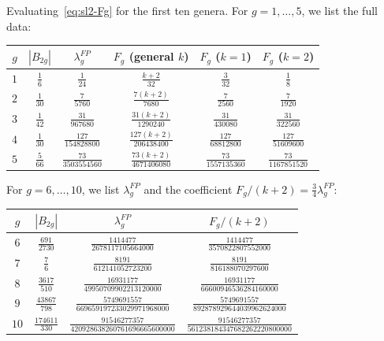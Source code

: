 \begin{computation}[Explicit values through \texorpdfstring{$g = 10$}{g = 10}]\label{comp:sl2-genus-table}
Evaluating~\eqref{eq:sl2-Fg} for the first ten genera.
For $g = 1, \ldots, 5$, we list the full data:

\medskip
\begin{center}
\renewcommand{\arraystretch}{1.3}
\begin{tabular}{cccccc}
\toprule
$g$ & $|B_{2g}|$ & $\lambda_g^{FP}$ & $F_g$ (general $k$) & $F_g$ ($k=1$) & $F_g$ ($k=2$)  \\
\midrule
$1$ & $\frac{1}{6}$ & $\frac{1}{24}$ & $\frac{k+2}{32}$ & $\frac{3}{32}$ & $\frac{1}{8}$  \\[6pt]
$2$ & $\frac{1}{30}$ & $\frac{7}{5760}$ & $\frac{7(k+2)}{7680}$ & $\frac{7}{2560}$ & $\frac{7}{1920}$  \\[6pt]
$3$ & $\frac{1}{42}$ & $\frac{31}{967680}$ & $\frac{31(k+2)}{1290240}$ & $\frac{31}{430080}$ & $\frac{31}{322560}$  \\[6pt]
$4$ & $\frac{1}{30}$ & $\frac{127}{154828800}$ & $\frac{127(k+2)}{206438400}$ & $\frac{127}{68812800}$ & $\frac{127}{51609600}$  \\[6pt]
$5$ & $\frac{5}{66}$ & $\frac{73}{3503554560}$ & $\frac{73(k+2)}{4671406080}$ & $\frac{73}{1557135360}$ & $\frac{73}{1167851520}$  \\[4pt]
\bottomrule
\end{tabular}
\end{center}

\medskip
\noindent
For $g = 6, \ldots, 10$, we list $\lambda_g^{FP}$ and the coefficient
$F_g/(k{+}2) = \frac{3}{4}\lambda_g^{FP}$:

\medskip
\begin{center}
\renewcommand{\arraystretch}{1.3}
\begin{tabular}{cccc}
\toprule
$g$ & $|B_{2g}|$ & $\lambda_g^{FP}$ & $F_g/(k{+}2)$ \\
\midrule
$6$ & $\frac{691}{2730}$ & $\frac{1414477}{2678117105664000}$ & $\frac{1414477}{3570822807552000}$ \\[6pt]
$7$ & $\frac{7}{6}$ & $\frac{8191}{612141052723200}$ & $\frac{8191}{816188070297600}$ \\[6pt]
$8$ & $\frac{3617}{510}$ & $\frac{16931177}{49950709902213120000}$ & $\frac{16931177}{66600946536284160000}$ \\[6pt]
$9$ & $\frac{43867}{798}$ & $\frac{5749691557}{669659197233029971968000}$ & $\frac{5749691557}{892878929644039962624000}$ \\[6pt]
$10$ & $\frac{174611}{330}$ & $\frac{91546277357}{420928638260761696665600000}$ & $\frac{91546277357}{561238184347682262220800000}$ \\[4pt]
\bottomrule
\end{tabular}
\end{center}


\end{computation}
